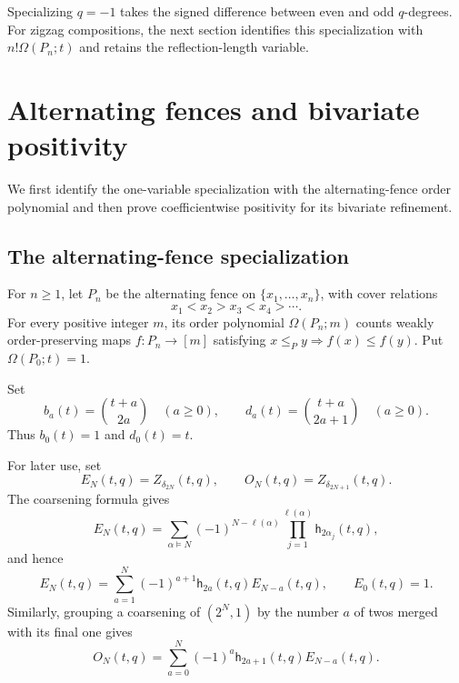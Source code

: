 \documentclass{amsart}
\theoremstyle{definition}
\theoremstyle{remark}
\begin{document}
Specializing $q=-1$ takes the signed difference between even and odd
$q$-degrees.  For zigzag compositions, the next section identifies
this specialization with $n!\Omega(P_n;t)$ and retains the reflection-length variable.

\section{Alternating fences and bivariate positivity}
\label{sec:staircase-consequences}

We first identify the one-variable specialization with the alternating-fence
order polynomial and then prove coefficientwise positivity for its bivariate
refinement.

\subsection{The alternating-fence specialization}

For \(n\geq1\), let \(P_n\) be the alternating fence on
\(\{x_1,\ldots,x_n\}\), with cover relations
\begin{equation*}
 x_1<x_2>x_3<x_4>\cdots.
\end{equation*}
For every positive integer $m$, its order polynomial $\Omega(P_n;m)$ counts
weakly order-preserving maps $f:P_n\to[m]$ satisfying
$x\leq_P y\Rightarrow f(x)\leq f(y)$.  Put $\Omega(P_0;t)=1$.

Set
\begin{equation*}
 b_a(t)=\binom{t+a}{2a}\quad(a\geq0),\qquad
 d_a(t)=\binom{t+a}{2a+1}\quad(a\geq0).
\end{equation*}
Thus \(b_0(t)=1\) and \(d_0(t)=t\).

For later use, set
\[
 E_N(t,q)=Z_{\delta_{2N}}(t,q),\qquad
 O_N(t,q)=Z_{\delta_{2N+1}}(t,q).
\]
The coarsening formula gives
\begin{equation}
 E_N(t,q)
 =\sum_{\alpha\models N}(-1)^{N-\ell(\alpha)}
  \prod_{j=1}^{\ell(\alpha)}\mathsf h_{2\alpha_j}(t,q),
 \label{eq:even-composition-expansion}
\end{equation}
and hence
\begin{equation}
 E_N(t,q)=\sum_{a=1}^{N}(-1)^{a+1}
 \mathsf h_{2a}(t,q)E_{N-a}(t,q),\qquad E_0(t,q)=1.
 \label{eq:E-recurrence-q}
\end{equation}
Similarly, grouping a coarsening of \((2^N,1)\) by the number \(a\) of
twos merged with its final one gives
\begin{equation}
 O_N(t,q)=\sum_{a=0}^{N}(-1)^a
 \mathsf h_{2a+1}(t,q)E_{N-a}(t,q).
 \label{eq:odd-even-convolution-q}
\end{equation}
\end{document}
